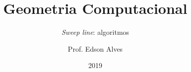 \title{Geometria Computacional}
\subtitle{\textit{Sweep line}: algoritmos} 
\date{2019}
\author{Prof. Edson Alves}

